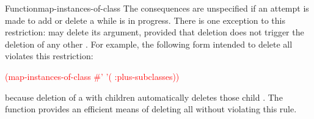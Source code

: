 \documentclass[10pt,twoside,english,pdftex]{article}
\begin{document}
\begin{functiondoc}{Function}{map-instances-of-class}
\fnnote
{}%
%
%
The consequences are unspecified if an attempt is made to add or delete a
 while  is in
progress.  There is one exception to this restriction: 
may delete its  argument, provided that deletion does not
trigger the deletion of any other .  For example, the
following form intended to delete all  violates this
restriction:
%
\W\supp
\begin{example}
   \textcolor{red}{(map-instances-of-class 
     #' '( :plus-subclasses))}
\end{example}
%
because deletion of a  with children automatically
deletes those child .  The function
 provides an efficient
means of deleting all  without violating this rule.

\end{functiondoc}

\end{document}
